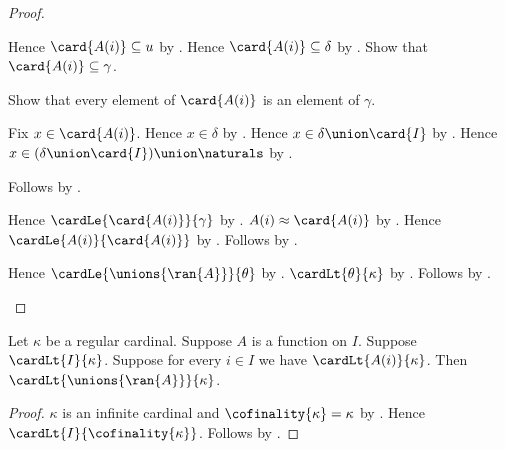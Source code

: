 \begin{proof}
\begin{byCase}
\begin{subproof}
                Hence $\card{A(i)}\subseteq u$ by
                    .
                Hence $\card{A(i)}\subseteq\delta$ by
                    .
                Show that $\card{A(i)}\subseteq\gamma$.
                \begin{subproof}
                    Show that every element of $\card{A(i)}$ is an element
                        of $\gamma$.
                    \begin{subproof}
                        Fix $x\in\card{A(i)}$.
                        Hence $x\in\delta$ by .
                        Hence $x\in\delta\union\card{I}$ by
                            .
                        Hence $x\in(\delta\union\card{I})\union\naturals$ by
                            .
                    \end{subproof}
                    Follows by .
                \end{subproof}
                Hence $\cardLe{\card{A(i)}}{\gamma}$ by
                    .
                $A(i)\approx\card{A(i)}$ by
                    .
                Hence $\cardLe{A(i)}{\card{A(i)}}$ by
                    .
                Follows by .
            \end{subproof}
            Hence $\cardLe{\unions{\ran{A}}}{\theta}$ by
                .
            $\cardLt{\theta}{\kappa}$ by
                .
            Follows by .
    \end{byCase}
\end{proof}

\begin{corollary}\label{regular_indexed_union}
    Let $\kappa$ be a regular cardinal.
    Suppose $A$ is a function on $I$.
    Suppose $\cardLt{I}{\kappa}$.
    Suppose for every $i\in I$ we have $\cardLt{A(i)}{\kappa}$.
    Then $\cardLt{\unions{\ran{A}}}{\kappa}$.
\end{corollary}
\begin{proof}
    $\kappa$ is an infinite cardinal and
        $\cofinality{\kappa}=\kappa$ by .
    Hence $\cardLt{I}{\cofinality{\kappa}}$.
    Follows by .
\end{proof}

